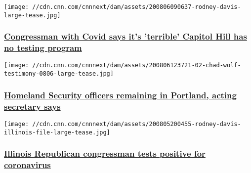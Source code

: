 \href{/2020/08/06/politics/rodney-davis-capitol-hill-testing-program-cnntv/index.html}{}

\texttt{[image: //cdn.cnn.com/cnnnext/dam/assets/200806090637-rodney-davis-large-tease.jpg]}

\hypertarget{congressman-with-covid-says-its-terrible-capitol-hill-has-no-testing-program}{%
\subsubsection{\texorpdfstring{\href{/2020/08/06/politics/rodney-davis-capitol-hill-testing-program-cnntv/index.html}{Congressman
with Covid says it's 'terrible' Capitol Hill has no testing
program}}{Congressman with Covid says it's 'terrible' Capitol Hill has no testing program}}\label{congressman-with-covid-says-its-terrible-capitol-hill-has-no-testing-program}}

\href{/2020/08/06/politics/wolf-defends-dhs-portland/index.html}{}

\texttt{[image: //cdn.cnn.com/cnnnext/dam/assets/200806123721-02-chad-wolf-testimony-0806-large-tease.jpg]}

\hypertarget{homeland-security-officers-remaining-in-portland-acting-secretary-says}{%
\subsubsection{\texorpdfstring{\href{/2020/08/06/politics/wolf-defends-dhs-portland/index.html}{Homeland
Security officers remaining in Portland, acting secretary
says}}{Homeland Security officers remaining in Portland, acting secretary says}}\label{homeland-security-officers-remaining-in-portland-acting-secretary-says}}

\href{/2020/08/05/politics/republican-congressman-tests-positive-coronavirus-rodney-davis-illinois/index.html}{}

\texttt{[image: //cdn.cnn.com/cnnnext/dam/assets/200805200455-rodney-davis-illinois-file-large-tease.jpg]}

\hypertarget{illinois-republican-congressman-tests-positive-for-coronavirus}{%
\subsubsection{\texorpdfstring{\href{/2020/08/05/politics/republican-congressman-tests-positive-coronavirus-rodney-davis-illinois/index.html}{Illinois
Republican congressman tests positive for
coronavirus}}{Illinois Republican congressman tests positive for coronavirus}}\label{illinois-republican-congressman-tests-positive-for-coronavirus}}

